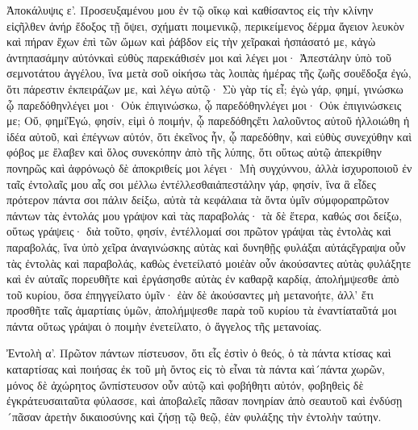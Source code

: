 Ἀποκάλυψις ε’.
Προσευξαμένου μου ἐν τῷ οἴκῳ καὶ καθίσαντος εἰς τὴν κλίνην εἰςῆλθεν ἀνήρ ἔδοξος τῇ ὄψει, σχήματι ποιμενικῷ, περικείμενος δέρμα ἄγειον λευκὸν καὶ πήραν ἔχων ἐπὶ τῶν ὤμων καὶ ῥάβδον εἰς τὴν χεῖρακαὶ ἠσπάσατό με, κἀγὼ ἀντηπασάμην αὐτόνκαὶ εὐθὺς παρεκάθισέν μοι καὶ λέγει μοι· Ἀπεστάλην ὑπὸ τοῦ σεμνοτάτου ἀγγέλου, ἵνα μετὰ σοῦ οἰκήσω τὰς λοιπὰς ἡμέρας τῆς ζωῆς σουἔδοξα ἐγώ, ὅτι πάρεστιν ἐκπειράζων με, καὶ λέγω αὐτῷ· Σὺ γὰρ τίς εἶ; ἐγὼ γάρ, φημί, γινώσκω ᾧ παρεδόθηνλέγει μοι· Οὐκ ἐπιγινώσκω, ᾧ παρεδόθηνλέγει μοι· Οὐκ ἐπιγινώσκεις με; Οὔ, φημίἘγώ, φησίν, εἰμὶ ὁ ποιμήν, ᾧ παρεδόθηςἔτι λαλοῦντος αὐτοῦ ἠλλοιώθη ἡ ἰδέα αὐτοῦ, καὶ ἐπέγνων αὐτόν, ὅτι ἐκεῖνος ἦν, ᾧ παρεδόθην, καὶ εὐθὺς συνεχύθην καὶ φόβος με ἔλαβεν καὶ ὅλος συνεκόπην ἀπὸ τῆς λύπης, ὅτι οὕτως αὐτῷ ἀπεκρίθην πονηρῶς καὶ ἀφρόνωςὁ δὲ ἀποκριθείς μοι λέγει· Μὴ συγχύννου, ἀλλὰ ἰσχυροποιοῦ ἐν ταῖς ἐντολαῖς μου αἷς σοι μέλλω ἐντέλλεσθαιἀπεστάλην γάρ, φησίν, ἵνα ἃ εἶδες πρότερον πάντα σοι πάλιν δείξω, αὐτὰ τὰ κεφάλαια τὰ ὄντα ὑμῖν σύμφοραπρῶτον πάντων τὰς ἐντολάς μου γράψον καὶ τὰς παραβολάς· τὰ δὲ ἕτερα, καθώς σοι δείξω, οὕτως γράψεις· διὰ τοῦτο, φησίν, ἐντέλλομαί σοι πρῶτον γράψαι τὰς ἐντολὰς καὶ παραβολάς, ἵνα ὑπὸ χεῖρα ἀναγινώσκης αὐτὰς καὶ δυνηθῇς φυλάξαι αὐτάςἔγραψα οὖν τὰς ἐντολὰς καὶ παραβολάς, καθὼς ἐνετείλατό μοιἐὰν οὖν ἀκούσαντες αὐτὰς φυλάξητε καὶ ἐν αὐταῖς πορευθῆτε καὶ ἐργάσησθε αὐτὰς ἐν καθαρᾷ καρδίᾳ, ἀπολήμψεσθε ἀπὸ τοῦ κυρίου, ὅσα ἐπηγγείλατο ὑμῖν· ἐὰν δὲ ἀκούσαντες μὴ μετανοήτε, ἀλλ’ ἔτι προσθῆτε ταῖς ἁμαρτίαις ὑμῶν, ἀπολήμψεσθε παρὰ τοῦ κυρίου τὰ ἐναντίαταῦτά μοι πάντα οὕτως γράψαι ὁ ποιμὴν ἐνετείλατο, ὁ ἄγγελος τῆς μετανοίας.

Ἐντολὴ α’.
Πρῶτον πάντων πίστευσον, ὅτι εἷς ἐστὶν ὁ θεός, ὁ τὰ πάντα κτίσας καὶ καταρτίσας καὶ ποιήσας ἐκ τοῦ μὴ ὄντος εἰς τὸ εἶναι τὰ πάντα καὶ´πάντα χωρῶν, μόνος δὲ ἀχώρητος ὤνπίστευσον οὖν αὐτῷ καὶ φοβήθητι αὐτόν, φοβηθεὶς δὲ ἐγκράτευσαιταῦτα φύλασσε, καὶ ἀποβαλεῖς πᾶσαν πονηρίαν ἀπὸ σεαυτοῦ καὶ ἐνδύσῃ´πᾶσαν ἀρετὴν δικαιοσύνης καὶ ζήσῃ τῷ θεῷ, ἐὰν φυλάξης τὴν ἐντολὴν ταύτην.

